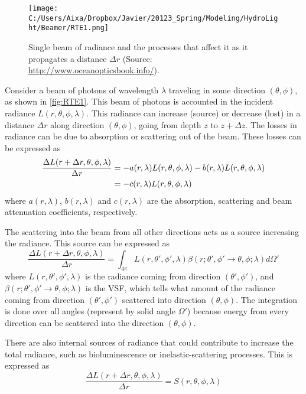 \begin{figure}[htb]
\centering
      \texttt{[image: C:/Users/Aixa/Dropbox/Javier/20123\_Spring/Modeling/HydroLight/Beamer/RTE1.png]}
      \caption{Single beam of radiance and the processes that affect it as it propagates a distance $\Delta r$ (Source: \protect\url{http://www.oceanopticsbook.info/}).}
      \label{fig:RTE1}
\end{figure}

Consider a beam of photons of wavelength $\lambda$ traveling in some direction $(\theta,\phi)$, as shown in \autoref{fig:RTE1}. This beam of photons is accounted in the incident radiance $L(r,\theta,\phi,\lambda)$. This radiance can increase (source) or decrease (lost) in a distance $\Delta r$ along direction  $(\theta,\phi)$, going from depth $z$ to $z+\Delta z$. The losses in radiance can be due to absorption or scattering out of the beam. These losses can be expressed as
\begin{align}\label{eq:RTE1}
  \frac{\Delta L(r+\Delta r,\theta,\phi,\lambda)}{\Delta r}&= -a(r,\lambda)L(r,\theta,\phi,\lambda)-b(r,\lambda)L(r,\theta,\phi,\lambda)\notag\\ 
  &= -c(r,\lambda)L(r,\theta,\phi,\lambda) 
\end{align}
where $a(r,\lambda)$, $b(r,\lambda)$ and $c(r,\lambda)$ are the absorption, scattering and beam attenuation coefficients, respectively. 

The scattering into the beam from all other directions acts as a source increasing the radiance. This source can be expressed as
\begin{equation}\label{eq:RTE2}
\frac{\Delta L(r+\Delta r,\theta,\phi,\lambda)}{\Delta r} = \int_{4\pi} L(r,\theta',\phi',\lambda)\beta(r;\theta',\phi' \to \theta,\phi;\lambda)d\Omega'
\end{equation}
where $L(r,\theta',\phi',\lambda)$ is the radiance coming from direction $(\theta',\phi')$, and $\beta(r;\theta',\phi' \to \theta,\phi;\lambda)$ is the VSF, which tells what amount of the radiance coming from direction $(\theta',\phi')$ scattered into direction $(\theta,\phi)$. The integration is done over all angles (represent by solid angle $\Omega'$) because energy from every direction can be scattered into the direction $(\theta,\phi)$.

There are also internal sources of radiance that could contribute to increase the total radiance, such as bioluminescence or inelastic-scattering processes. This is expressed as
\begin{equation}\label{eq:RTE3}
    \frac{\Delta L(r+\Delta r,\theta,\phi,\lambda)}{\Delta r} = S(r,\theta,\phi,\lambda)
\end{equation}

